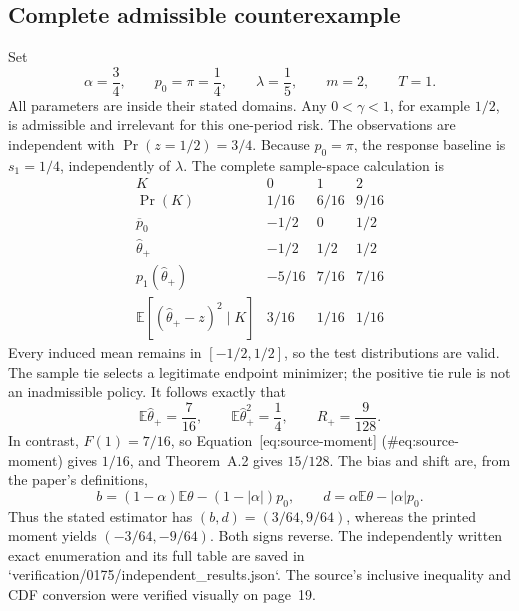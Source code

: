 \documentclass[10pt]{article}
\begin{document}
\subsection*{Complete admissible counterexample}
Set \[\alpha=\frac34,\qquad p_0=\pi=\frac14,\qquad
 \lambda=\frac15,\qquad m=2,\qquad T=1.\] All parameters are inside their stated domains. Any \(0<\gamma<1\), for example \(1/2\), is admissible and irrelevant for this one-period risk. The observations are independent with \(\Pr(z=1/2)=3/4\). Because \(p_0=\pi\), the response baseline is \(s_1=1/4\), independently of \(\lambda\). The complete sample-space calculation is \[\begin{array}{c|ccc}
 K&0&1&2\\ \hline
 \Pr(K)&1/16&6/16&9/16\\
 \overline p_0&-1/2&0&1/2\\
 \widehat\theta_+&-1/2&1/2&1/2\\
 p_1(\widehat\theta_+)&-5/16&7/16&7/16\\
 \mathbb E[(\widehat\theta_+-z)^2\mid K]&3/16&1/16&1/16
\end{array}\] Every induced mean remains in \([-1/2,1/2]\), so the test distributions are valid. The sample tie selects a legitimate endpoint minimizer; the positive tie rule is not an inadmissible policy. It follows exactly that \[\mathbb E\widehat\theta_+=\frac7{16},\qquad
 \mathbb E\widehat\theta_+^2=\frac14,\qquad
 R_+=\frac9{128}.\] In contrast, \(F(1)=7/16\), so Equation [eq:source-moment] (\#eq:source-moment) gives \(1/16\), and Theorem A.2 gives \(15/128\). The bias and shift are, from the paper’s definitions, \[b=(1-\alpha)\mathbb E\theta-(1-|\alpha|)p_0,\qquad
 d=\alpha\mathbb E\theta-|\alpha|p_0.\] Thus the stated estimator has \((b,d)=(3/64,9/64)\), whereas the printed moment yields \((-3/64,-9/64)\). Both signs reverse. The independently written exact enumeration and its full table are saved in `verification/0175/independent\_results.json`. The source’s inclusive inequality and CDF conversion were verified visually on page 19.\par
\end{document}
